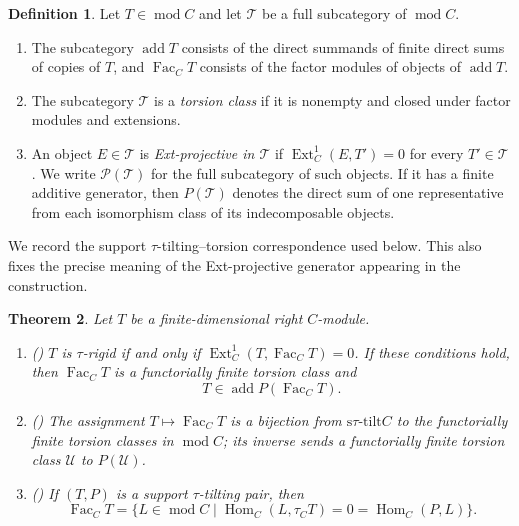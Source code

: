 \documentclass[11pt,reqno]{amsart}
\newtheorem{theorem}{Theorem}[section]
\theoremstyle{definition}
\newtheorem{definition}[theorem]{Definition}
\theoremstyle{remark}
\newcommand{\modu}{\operatorname{mod}}
\newcommand{\Fac}{\operatorname{Fac}}
\newcommand{\addc}{\operatorname{add}}
\newcommand{\Ext}{\operatorname{Ext}}
\newcommand{\Hom}{\operatorname{Hom}}
\newcommand{\stau}{\mathrm{s}\tau\text{-}\mathrm{tilt}}
\numberwithin{equation}{section}
\begin{document}
\begin{definition}\label{def:torsion-notation}
Let $T\in\modu C$ and let $\mathcal T$ be a full subcategory of $\modu C$.
\begin{enumerate}[label=\textup{(\arabic*)},leftmargin=2.2em,nosep]
 \item The subcategory $\addc T$ consists of the direct summands of finite
 direct sums of copies of $T$, and $\Fac_CT$ consists of the factor modules
 of objects of $\addc T$.
 \item The subcategory $\mathcal T$ is a \emph{torsion class} if it is
 nonempty and closed under factor modules and extensions.
 \item An object $E\in\mathcal T$ is \emph{Ext-projective in $\mathcal T$}
 if $\Ext_C^1(E,T')=0$ for every $T'\in\mathcal T$.  We write
 $\mathcal P(\mathcal T)$ for the full subcategory of such objects.  If it
 has a finite additive generator, then $P(\mathcal T)$ denotes the direct
 sum of one representative from each isomorphism class of its
 indecomposable objects.
\end{enumerate}
\end{definition}

We record the support $\tau$-tilting--torsion correspondence used below.
This also fixes the precise meaning of the Ext-projective generator appearing
in the construction.

\begin{theorem}
\label{thm:AIR-torsion}
Let $T$ be a finite-dimensional right $C$-module.
\begin{enumerate}[label=\textup{(\arabic*)},leftmargin=2.2em]
 \item \textup{(\cite[Proposition~1.2]{AIR})} $T$ is $\tau$-rigid if and only if
$\Ext_C^1(T,\Fac_CT)=0$.  If these conditions hold, then $\Fac_CT$ is a
functorially finite torsion class and
\[
 T\in\addc P(\Fac_CT).
\]
 \item \textup{(\cite[Theorem~2.7]{AIR})} The assignment
$T\mapsto\Fac_CT$ is a bijection from
$\stau C$ to the functorially finite torsion classes in $\modu C$; its
inverse sends a functorially finite torsion class $\mathcal U$ to
$P(\mathcal U)$.
 \item \textup{(\cite[Corollary~2.13(c)]{AIR})} If $(T,P)$ is a support
$\tau$-tilting pair, then
 \begin{equation}\label{eq:Fac-orthogonality}
  \Fac_CT
  =\{L\in\modu C\mid
       \Hom_C(L,\tau_CT)=0=\Hom_C(P,L)\}.
 \end{equation}
\end{enumerate}
\end{theorem}
\end{document}

